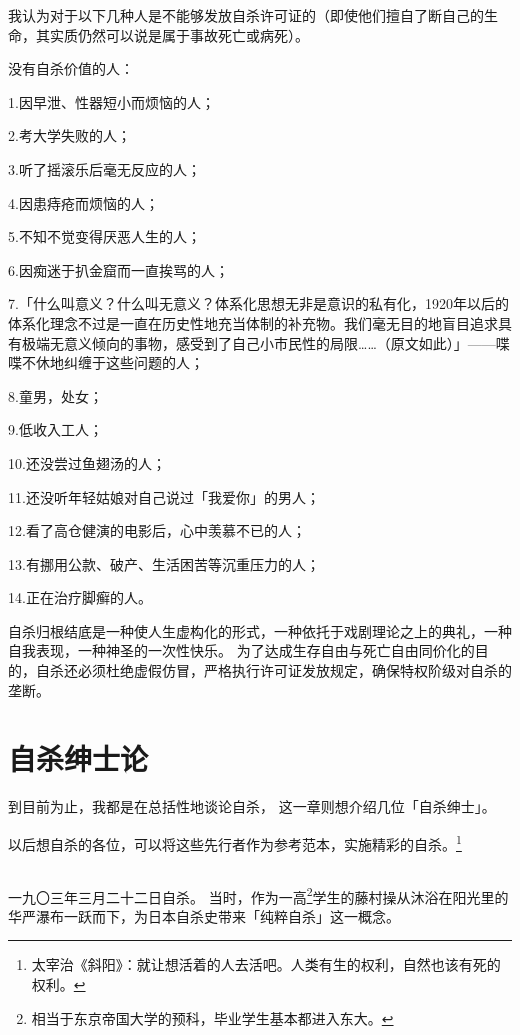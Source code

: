 \documentclass[UTF8]{ctexart}
\begin{document}
我认为对于以下几种人是不能够发放自杀许可证的（即使他们擅自了断自己的生命，其实质仍然可以说是属于事故死亡或病死）。

没有自杀价值的人：

1.因早泄、性器短小而烦恼的人；

2.考大学失败的人；

3.听了摇滚乐后毫无反应的人；

4.因患痔疮而烦恼的人；

5.不知不觉变得厌恶人生的人；

6.因痴迷于扒金窟而一直挨骂的人；

7.「什么叫意义？什么叫无意义？体系化思想无非是意识的私有化，1920年以后的体系化理念不过是一直在历史性地充当体制的补充物。我们毫无目的地盲目追求具有极端无意义倾向的事物，感受到了自己小市民性的局限……（原文如此）」——喋喋不休地纠缠于这些问题的人；

8.童男，处女；

9.低收入工人；

10.还没尝过鱼翅汤的人；

11.还没听年轻姑娘对自己说过「我爱你」的男人；

12.看了高仓健演的电影后，心中羡慕不已的人；

13.有挪用公款、破产、生活困苦等沉重压力的人；

14.正在治疗脚癣的人。

自杀归根结底是一种使人生虚构化的形式，一种依托于戏剧理论之上的典礼，一种自我表现，一种神圣的一次性快乐。
为了达成生存自由与死亡自由同价化的目的，自杀还必须杜绝虚假仿冒，严格执行许可证发放规定，确保特权阶级对自杀的垄断。

\section{自杀绅士论}

到目前为止，我都是在总括性地谈论自杀，
这一章则想介绍几位「自杀绅士」。

以后想自杀的各位，可以将这些先行者作为参考范本，实施精彩的自杀。\footnote{太宰治《斜阳》：就让想活着的人去活吧。人类有生的权利，自然也该有死的权利。}

\subsection{}
一九〇三年三月二十二日自杀。
当时，作为一高\footnote{相当于东京帝国大学的预科，毕业学生基本都进入东大。}学生的藤村操从沐浴在阳光里的华严瀑布一跃而下，为日本自杀史带来「纯粹自杀」这一概念。
\end{document}
